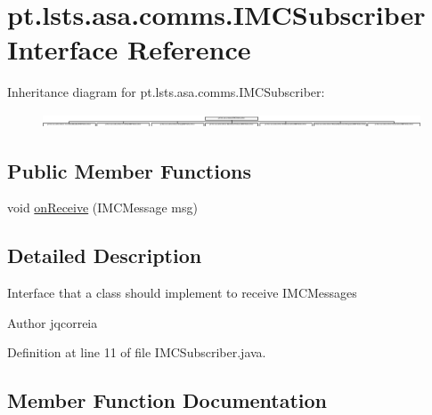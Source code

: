 \hypertarget{interfacept_1_1lsts_1_1asa_1_1comms_1_1IMCSubscriber}{}\section{pt.\+lsts.\+asa.\+comms.\+I\+M\+C\+Subscriber Interface Reference}
\label{interfacept_1_1lsts_1_1asa_1_1comms_1_1IMCSubscriber}
Inheritance diagram for pt.\+lsts.\+asa.\+comms.\+I\+M\+C\+Subscriber\+:\begin{figure}[H]
\begin{center}
\leavevmode
\includegraphics[height=0.415584cm]{interfacept_1_1lsts_1_1asa_1_1comms_1_1IMCSubscriber}
\end{center}
\end{figure}
\subsection*{Public Member Functions}
\begin{DoxyCompactItemize}
\item 
void \hyperlink{interfacept_1_1lsts_1_1asa_1_1comms_1_1IMCSubscriber_a69a6f911572580c234e4255634360db3}{on\+Receive} (I\+M\+C\+Message msg)
\end{DoxyCompactItemize}


\subsection{Detailed Description}
Interface that a class should implement to receive I\+M\+C\+Messages

\begin{DoxyAuthor}{Author}
jqcorreia 
\end{DoxyAuthor}


Definition at line 11 of file I\+M\+C\+Subscriber.\+java.



\subsection{Member Function Documentation}
\hypertarget{interfacept_1_1lsts_1_1asa_1_1comms_1_1IMCSubscriber_a69a6f911572580c234e4255634360db3}{}
